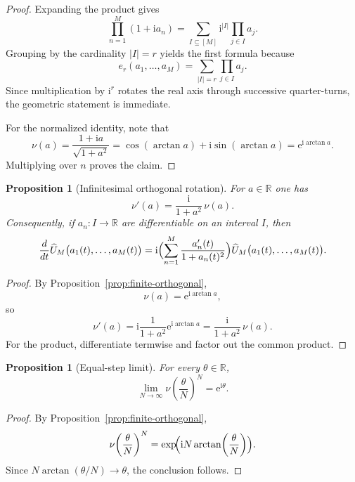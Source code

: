 \documentclass[11pt,a4paper]{article}
\numberwithin{equation}{section}
\newtheorem{proposition}[theorem]{Proposition}
\theoremstyle{definition}
\theoremstyle{remark}
\newcommand{\RR}{\mathbb R}
\newcommand{\e}{\mathrm e}
\newcommand{\ii}{\mathrm i}
\begin{document}
\begin{proof}
Expanding the product gives
\[
\prod_{n=1}^M (1+\ii a_n)=\sum_{I\subseteq [M]} \ii^{|I|}\prod_{j\in I} a_j.
\]
Grouping by the cardinality $|I|=r$ yields the first formula because
\[
e_r(a_1,\dots,a_M)=\sum_{|I|=r}\prod_{j\in I}a_j.
\]
Since multiplication by $\ii^r$ rotates the real axis through successive quarter-turns, the geometric statement is immediate.

For the normalized identity, note that
\[
\nu(a)=\frac{1+\ii a}{\sqrt{1+a^2}}=
\cos(\arctan a)+\ii\sin(\arctan a)=\e^{\ii\arctan a}.
\]
Multiplying over $n$ proves the claim.
\end{proof}

\begin{proposition}[Infinitesimal orthogonal rotation]\label{prop:derivative-nu}
For $a\in\RR$ one has
\[
\nu'(a)=\frac{\ii}{1+a^2}\,\nu(a).
\]
Consequently, if $a_n:I\to\RR$ are differentiable on an interval $I$, then
\[
\frac{d}{dt}\widehat U_M\bigl(a_1(t),\dots,a_M(t)\bigr)
=\ii\Bigl(\sum_{n=1}^M \frac{a_n'(t)}{1+a_n(t)^2}\Bigr)
\widehat U_M\bigl(a_1(t),\dots,a_M(t)\bigr).
\]
\end{proposition}

\begin{proof}
By Proposition~\ref{prop:finite-orthogonal},
\[
\nu(a)=\e^{\ii\arctan a},
\]
so
\[
\nu'(a)=\ii\frac{1}{1+a^2}\e^{\ii\arctan a}=\frac{\ii}{1+a^2}\,\nu(a).
\]
For the product, differentiate termwise and factor out the common product.
\end{proof}

\begin{proposition}[Equal-step limit]\label{prop:equal-step-limit}
For every $\theta\in\RR$,
\[
\lim_{N\to\infty}\nu\!\left(\frac{\theta}{N}\right)^N=\e^{\ii\theta}.
\]
\end{proposition}

\begin{proof}
By Proposition~\ref{prop:finite-orthogonal},
\[
\nu\!\left(\frac{\theta}{N}\right)^N
=\exp\!\Bigl(\ii N\arctan\!\left(\frac{\theta}{N}\right)\Bigr).
\]
Since $N\arctan(\theta/N)\to \theta$, the conclusion follows.
\end{proof}
\end{document}
